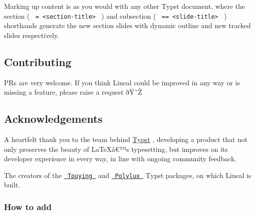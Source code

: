 \begin{Shaded}
\begin{Highlighting}[]

\NormalTok{  ),}
\NormalTok{)}


\end{Highlighting}
\end{Shaded}

Marking up content is as you would with any other Typst document, where
the section ( \texttt{\ =\ \textless{}section-title\textgreater{}\ } )
and subsection ( \texttt{\ ==\ \textless{}slide-title\textgreater{}\ } )
shorthands generate the new section slides with dynamic outline and new
tracked slides respectively.

\subsection{Contributing}\label{contributing}

PRs are very welcome. If you think Lineal could be improved in any way
or is missing a feature, please raise a request ðŸ˜Ž

\subsection{Acknowledgements}\label{acknowledgements}

A heartfelt thank you to the team behind
\href{https://github.com/typst/typst}{Typst} , developing a product that
not only preserves the beauty of LaTeXâ€™s typesetting, but improves on
its developer experience in every way, in line with ongoing community
feedback.

The creators of the
\href{https://github.com/touying-typ/touying}{\texttt{\ Touying\ }} and
\href{https://github.com/andreasKroepelin/polylux}{\texttt{\ Polylux\ }}
Typst packages, on which Lineal is built.

\subsubsection{How to add}\label{how-to-add}

